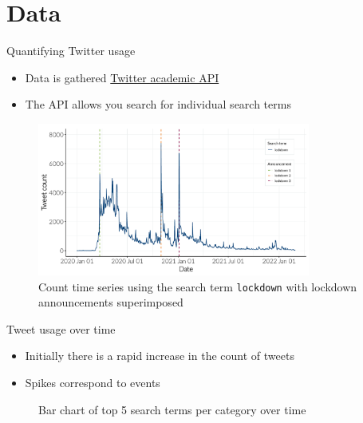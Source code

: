 \documentclass{beamer}
\begin{document}
\section{Data}
\begin{frame}{Quantifying Twitter usage}
\begin{itemize}
 \item  Data is gathered \href{https://developer.twitter.com/en/products/twitter-api/academic-research}{Twitter academic
    API} \\[5pt]
 \item  The API allows you search for individual search terms
\end{itemize}
\begin{figure}[!ht]
  \centering
  \includegraphics[width=0.8\textwidth]{figures/lockdown_count.pdf}
  \caption{Count time series using the search term \texttt{lockdown} with
    lockdown announcements superimposed}
\end{figure} 
\end{frame}

\begin{frame}{Tweet usage over time}
  \begin{itemize}
  \item Initially there is a rapid increase in the count of tweets\\[5pt]
  \item Spikes correspond to events
  \end{itemize}

  \begin{figure}[!ht]
    \centering
    \caption{Bar chart of top 5 search terms per category over time}
  \end{figure} 
\end{frame}
\end{document}

